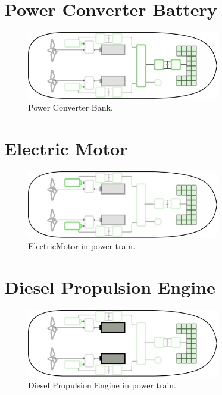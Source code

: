 \newpage

\section{Power Converter Battery}

\begin{figure}[h!]
    \centering
    \includegraphics[width=0.75\textwidth]{images/chapter05/03_PowerConverterBatt/PowerConverterBatt.jpg}
    \caption{Power Converter Bank.}
    \label{BattBank_pw}
\end{figure}

\newpage

\section{Electric Motor}

\begin{figure}[h]
    \centering
    \includegraphics[width=0.75\textwidth]{images/chapter05/ElectricMotor_scheme.jpg}
    \caption{ElectricMotor in power train.}
    \label{ElectricMotor}
\end{figure}

\newpage



\section{Diesel Propulsion Engine}

\begin{figure}[!ht]
    \centering
    \includegraphics[width=0.75\textwidth]{images/chapter05/DieselEngine_scheme.jpg}
    \caption{Diesel Propulsion Engine in power train.}
    \label{Diesel Engine}
\end{figure}

